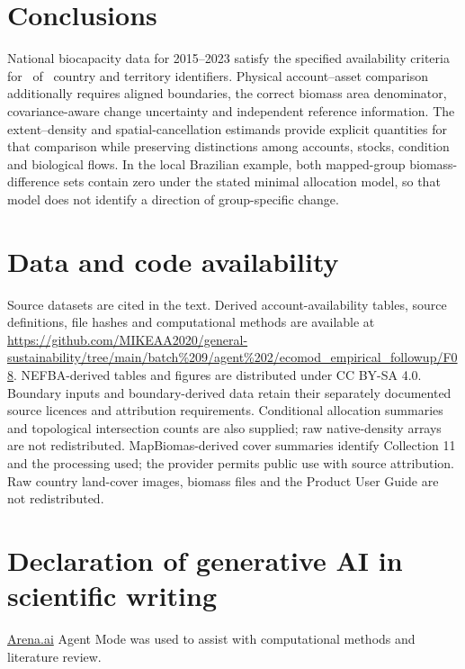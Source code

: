 \documentclass[11pt,a4paper]{article}
\begin{document}
\section{Conclusions}
National biocapacity data for 2015--2023 satisfy the specified availability criteria for \AccountPass\ of \CountryIDs\ country and territory identifiers. Physical account--asset comparison additionally requires aligned boundaries, the correct biomass area denominator, covariance-aware change uncertainty and independent reference information. The extent--density and spatial-cancellation estimands provide explicit quantities for that comparison while preserving distinctions among accounts, stocks, condition and biological flows. In the local Brazilian example, both mapped-group biomass-difference sets contain zero under the stated minimal allocation model, so that model does not identify a direction of group-specific change.

\section*{Data and code availability}
Source datasets are cited in the text. Derived account-availability tables, source definitions, file hashes and computational methods are available at \url{https://github.com/MIKEAA2020/general-sustainability/tree/main/batch%209/agent%202/ecomod_empirical_followup/F08}. NEFBA-derived tables and figures are distributed under CC BY-SA 4.0. Boundary inputs and boundary-derived data retain their separately documented source licences and attribution requirements. Conditional allocation summaries and topological intersection counts are also supplied; raw native-density arrays are not redistributed. MapBiomas-derived cover summaries identify Collection 11 and the processing used; the provider permits public use with source attribution. Raw country land-cover images, biomass files and the Product User Guide are not redistributed.

\section*{Declaration of generative AI in scientific writing}
\href{http://Arena.ai}{Arena.ai} Agent Mode was used to assist with computational methods and literature review.
\end{document}
